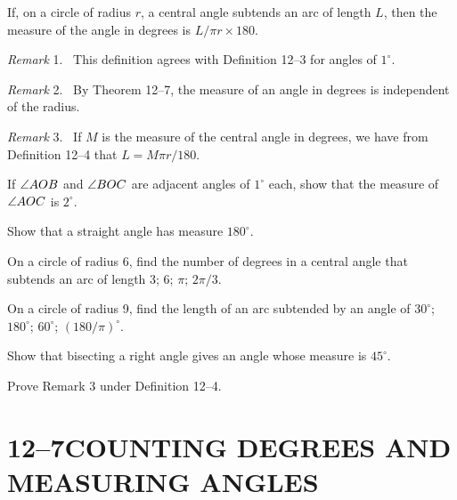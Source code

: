 \documentclass[11pt]{book}
\newenvironment{XIIremarkn}[1]{\par\medskip\noindent\emph{Remark} #1.\ }%
  {\par\medskip}
\begin{document}
\begin{definition}
If, on a circle of radius $r$, a central angle subtends an arc of length $L$,
then the measure of the angle in degrees is $L/\pi r \times 180$.
\end{definition}

\begin{XIIremarkn}{1}
This definition agrees with Definition 12--3 for angles of $1^\circ$.
\end{XIIremarkn}

\begin{XIIremarkn}{2}
By Theorem 12--7, the measure of an angle in degrees is independent of the
radius.
\end{XIIremarkn}

\begin{XIIremarkn}{3}
If $M$ is the measure of the central angle in degrees, we have from
Definition 12--4 that $L = M\pi r/180$.
\end{XIIremarkn}

\begin{exercisecols}
\begin{exlist}
\item If $\angle AOB$ and $\angle BOC$ are adjacent angles of $1^\circ$ each, show
      that the measure of $\angle AOC$ is $2^\circ$.
\item Show that a straight angle has measure $180^\circ$.
\item On a circle of radius 6, find the number of degrees in a central angle
      that subtends an arc of length 3; 6; $\pi$; $2\pi/3$.
\item On a circle of radius 9, find the length of an arc subtended by an angle
      of $30^\circ$; $180^\circ$; $60^\circ$; $(180/\pi)^\circ$.
\item Show that bisecting a right angle gives an angle whose measure is
      $45^\circ$.
\item Prove Remark 3 under Definition 12--4.
\end{exlist}
\end{exercisecols}

\section*{12--7\quad COUNTING DEGREES AND\\MEASURING ANGLES}
\end{document}
